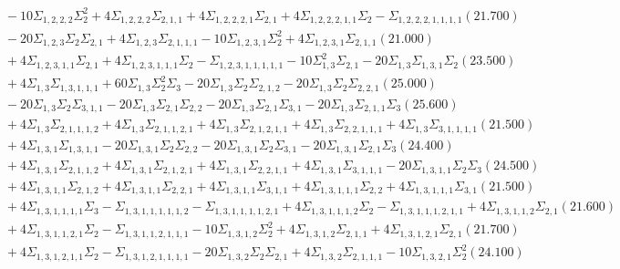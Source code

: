 \documentclass[12pt]{article}
\begin{document}
\begin{landscape}
\begin{align*}
		&\quad\quad -10\Sigma_{1,2,2,2}\Sigma_{2}^{2}+4\Sigma_{1,2,2,2}\Sigma_{2,1,1}+4\Sigma_{1,2,2,2,1}\Sigma_{2,1}+4\Sigma_{1,2,2,2,1,1}\Sigma_{2}-\Sigma_{1,2,2,2,1,1,1,1}(21.700) \\ 
		&\quad\quad -20\Sigma_{1,2,3}\Sigma_{2}\Sigma_{2,1}+4\Sigma_{1,2,3}\Sigma_{2,1,1,1}-10\Sigma_{1,2,3,1}\Sigma_{2}^{2}+4\Sigma_{1,2,3,1}\Sigma_{2,1,1}(21.000) \\ 
		&\quad\quad +4\Sigma_{1,2,3,1,1}\Sigma_{2,1}+4\Sigma_{1,2,3,1,1,1}\Sigma_{2}-\Sigma_{1,2,3,1,1,1,1,1}-10\Sigma_{1,3}^{2}\Sigma_{2,1}-20\Sigma_{1,3}\Sigma_{1,3,1}\Sigma_{2}(23.500) \\ 
		&\quad\quad +4\Sigma_{1,3}\Sigma_{1,3,1,1,1}+60\Sigma_{1,3}\Sigma_{2}^{2}\Sigma_{3}-20\Sigma_{1,3}\Sigma_{2}\Sigma_{2,1,2}-20\Sigma_{1,3}\Sigma_{2}\Sigma_{2,2,1}(25.000) \\ 
		&\quad\quad -20\Sigma_{1,3}\Sigma_{2}\Sigma_{3,1,1}-20\Sigma_{1,3}\Sigma_{2,1}\Sigma_{2,2}-20\Sigma_{1,3}\Sigma_{2,1}\Sigma_{3,1}-20\Sigma_{1,3}\Sigma_{2,1,1}\Sigma_{3}(25.600) \\ 
		&\quad\quad +4\Sigma_{1,3}\Sigma_{2,1,1,1,2}+4\Sigma_{1,3}\Sigma_{2,1,1,2,1}+4\Sigma_{1,3}\Sigma_{2,1,2,1,1}+4\Sigma_{1,3}\Sigma_{2,2,1,1,1}+4\Sigma_{1,3}\Sigma_{3,1,1,1,1}(21.500) \\ 
		&\quad\quad +4\Sigma_{1,3,1}\Sigma_{1,3,1,1}-20\Sigma_{1,3,1}\Sigma_{2}\Sigma_{2,2}-20\Sigma_{1,3,1}\Sigma_{2}\Sigma_{3,1}-20\Sigma_{1,3,1}\Sigma_{2,1}\Sigma_{3}(24.400) \\ 
		&\quad\quad +4\Sigma_{1,3,1}\Sigma_{2,1,1,2}+4\Sigma_{1,3,1}\Sigma_{2,1,2,1}+4\Sigma_{1,3,1}\Sigma_{2,2,1,1}+4\Sigma_{1,3,1}\Sigma_{3,1,1,1}-20\Sigma_{1,3,1,1}\Sigma_{2}\Sigma_{3}(24.500) \\ 
		&\quad\quad +4\Sigma_{1,3,1,1}\Sigma_{2,1,2}+4\Sigma_{1,3,1,1}\Sigma_{2,2,1}+4\Sigma_{1,3,1,1}\Sigma_{3,1,1}+4\Sigma_{1,3,1,1,1}\Sigma_{2,2}+4\Sigma_{1,3,1,1,1}\Sigma_{3,1}(21.500) \\ 
		&\quad\quad +4\Sigma_{1,3,1,1,1,1}\Sigma_{3}-\Sigma_{1,3,1,1,1,1,1,2}-\Sigma_{1,3,1,1,1,1,2,1}+4\Sigma_{1,3,1,1,1,2}\Sigma_{2}-\Sigma_{1,3,1,1,1,2,1,1}+4\Sigma_{1,3,1,1,2}\Sigma_{2,1}(21.600) \\ 
		&\quad\quad +4\Sigma_{1,3,1,1,2,1}\Sigma_{2}-\Sigma_{1,3,1,1,2,1,1,1}-10\Sigma_{1,3,1,2}\Sigma_{2}^{2}+4\Sigma_{1,3,1,2}\Sigma_{2,1,1}+4\Sigma_{1,3,1,2,1}\Sigma_{2,1}(21.700) \\ 
		&\quad\quad +4\Sigma_{1,3,1,2,1,1}\Sigma_{2}-\Sigma_{1,3,1,2,1,1,1,1}-20\Sigma_{1,3,2}\Sigma_{2}\Sigma_{2,1}+4\Sigma_{1,3,2}\Sigma_{2,1,1,1}-10\Sigma_{1,3,2,1}\Sigma_{2}^{2}(24.100) \\ 

\end{align*}
\end{landscape}
\end{document}
